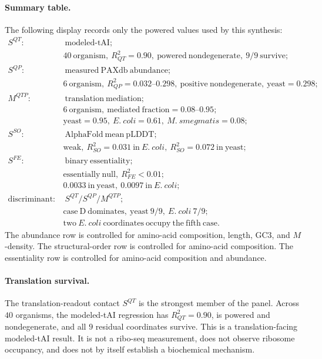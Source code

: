 \paragraph{Summary table.}
The following display records only the powered values used by this synthesis:
$$
\begin{aligned}
S^{QT}:&\ \mathrm{modeled\mbox{-}tAI};\\
&40\ \mathrm{organism},\ R^2_{QT}=0.90,\ \mathrm{powered\ nondegenerate},\ 9/9\ \mathrm{survive};\\
S^{QP}:&\ \mathrm{measured\ PAXdb\ abundance};\\
&6\ \mathrm{organism},\ R^2_{QP}=0.032\mbox{--}0.298,\ \mathrm{positive\ nondegenerate},\ \mathrm{yeast}=0.298;\\
M^{QTP}:&\ \mathrm{translation\ mediation};\\
&6\ \mathrm{organism},\ \mathrm{mediated\ fraction}=0.08\mbox{--}0.95;\\
&\mathrm{yeast}=0.95,\ E.\ coli=0.61,\ M.\ smegmatis=0.08;\\
S^{SO}:&\ \mathrm{AlphaFold\ mean\ pLDDT};\\
&\mathrm{weak},\ R^2_{SO}=0.031\ \mathrm{in}\ E.\ coli,\ R^2_{SO}=0.072\ \mathrm{in\ yeast};\\
S^{FE}:&\ \mathrm{binary\ essentiality};\\
&\mathrm{essentially\ null},\ R^2_{FE}<0.01;\\
&0.0033\ \mathrm{in\ yeast},\ 0.0097\ \mathrm{in}\ E.\ coli;\\
\mathrm{discriminant}:&\ S^{QT}/S^{QP}/M^{QTP};\\
&\mathrm{case\ D\ dominates},\ \mathrm{yeast}\ 9/9,\ E.\ coli\ 7/9;\\
&\mathrm{two}\ E.\ coli\ \mathrm{coordinates\ occupy\ the\ fifth\ case}.
\end{aligned}
$$
The abundance row is controlled for amino-acid composition, length, GC3, and $M$-density.  The structural-order row is controlled for amino-acid composition.  The essentiality row is controlled for amino-acid composition and abundance.

\paragraph{Translation survival.}
The translation-readout contact $S^{QT}$ is the strongest member of the panel.  Across $40$ organisms, the modeled-tAI regression has $R^2_{QT}=0.90$, is powered and nondegenerate, and all $9$ residual coordinates survive.  This is a translation-facing modeled-tAI result.  It is not a ribo-seq measurement, does not observe ribosome occupancy, and does not by itself establish a biochemical mechanism.

